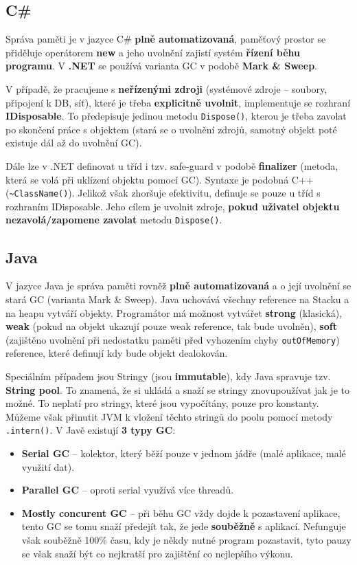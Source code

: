 \subsection{C\#}
Správa paměti je v jazyce C\# \textbf{plně automatizovaná}, paměťový prostor se přiděluje operátorem \textbf{new} a jeho uvolnění zajistí systém \textbf{řízení běhu programu}. V \textbf{.NET} se používá varianta GC v podobě \textbf{Mark \& Sweep}.

V případě, že pracujeme s \textbf{neřízenými zdroji} (systémové zdroje -- soubory, připojení k DB, síť), které je třeba \textbf{explicitně uvolnit}, implementuje se rozhraní \textbf{IDisposable}. To předepisuje jedinou metodu \texttt{Dispose()}, kterou je třeba zavolat po skončení práce s objektem (stará se o uvolnění zdrojů, samotný objekt poté existuje dál až do uvolnění GC).

Dále lze v .NET definovat u tříd i tzv. safe-guard v podobě \textbf{finalizer} (metoda, která se volá při uklízení objektu pomocí GC). Syntaxe je podobná C++ (\texttt{\textasciitilde{}ClassName()}). Jelikož však zhoršuje efektivitu, definuje se pouze u tříd s rozhraním IDisposable. Jeho cílem je uvolnit zdroje, \textbf{pokud uživatel objektu nezavolá/zapomene zavolat} metodu \texttt{Dispose()}.

\subsection{Java}
V jazyce Java je správa paměti rovněž \textbf{plně automatizovaná} a o její uvolnění se stará GC (varianta Mark \& Sweep). Java uchovává všechny reference na Stacku a na heapu vytváří objekty. Programátor má možnost vytvářet \textbf{strong} (klasická), \textbf{weak} (pokud na objekt ukazují pouze weak reference, tak bude uvolněn), \textbf{soft} (zajištěno uvolnění při nedostatku paměti před vyhozením chyby \texttt{outOfMemory}) reference, které definují kdy bude objekt dealokován.

Speciálním případem jsou Stringy (jsou \textbf{immutable}), kdy Java spravuje tzv. \textbf{String pool}. To znamená, že si ukládá a snaží se stringy znovupoužívat jak je to možné. To neplatí pro stringy, které jsou vypočítány, pouze pro konstanty. Můžeme však přinutit JVM k vložení těchto stringů do poolu pomocí metody \texttt{.intern()}. V Javě existují \textbf{3 typy GC}:
\begin{itemize}
    \item \textbf{Serial GC} -- kolektor, který běží pouze v jednom jádře (malé aplikace, malé využití dat).
    \item \textbf{Parallel GC} -- oproti serial využívá více threadů.
    \item \textbf{Mostly concurent GC} -- při běhu GC vždy dojde k pozastavení aplikace, tento GC se tomu snaží předejít tak, že jede \textbf{souběžně} s aplikací. Nefunguje však souběžně 100\% času, kdy je někdy nutné program pozastavit, tyto pauzy se však snaží být co nejkratší pro zajištění co nejlepšího výkonu.
\end{itemize}

